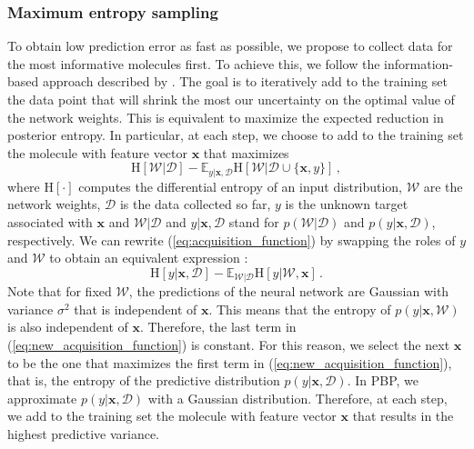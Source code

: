\subsubsection{Maximum entropy sampling}

To obtain low prediction error as fast as possible, we propose to collect data for the most informative molecules first. To achieve this, we follow the information-based approach described by \cite{MacKay_1992}. The goal is to iteratively add to the training set the data point that will shrink the most our uncertainty on the optimal value of the network weights. This is equivalent to maximize the expected reduction in posterior entropy. In particular, at each step, we choose to add to the training set the molecule with feature vector $\mathbf{x}$ that maximizes
\begin{equation}
\text{H}[\mathcal{W}|\mathcal{D}]  - 
\mathbb{E}_{y|\mathbf{x},\mathcal{D}}\text{H}[\mathcal{W}|\mathcal{D}\cup\{\mathbf{x},y\}]\,,\label{eq:acquisition_function}
\end{equation}
where $\text{H}[\cdot]$ computes the differential entropy of an input distribution, $\mathcal{W}$ are the network weights, $\mathcal{D}$ is the data collected so far, $y$ is the unknown target associated with $\mathbf{x}$ and $\mathcal{W}|\mathcal{D}$ and $y|\mathbf{x},\mathcal{D}$ stand for $p(\mathcal{W}|\mathcal{D})$ and $p(y|\mathbf{x},\mathcal{D})$, respectively. We can rewrite (\ref{eq:acquisition_function}) by swapping the roles of $y$ and $\mathcal{W}$ to obtain an equivalent expression \cite{houlsby2012collaborative}:
\begin{equation}
\text{H}[y | \mathbf{x},\mathcal{D}] - 
\mathbb{E}_{\mathcal{W} | \mathcal{D}}\text{H}[y | \mathcal{W},\mathbf{x}]\,.\label{eq:new_acquisition_function}
\end{equation}
Note that for fixed $\mathcal{W}$, the predictions of the neural network are Gaussian with variance $\sigma^2$ that is independent of $\mathbf{x}$. This means that the entropy of $p(y| \mathbf{x},\mathcal{W})$ is also independent of $\mathbf{x}$.
Therefore, the last term in (\ref{eq:new_acquisition_function}) is constant.
For this reason, we select the next $\mathbf{x}$ to be the one that maximizes the first term in (\ref{eq:new_acquisition_function}), that is,
the entropy of the predictive distribution $p(y| \mathbf{x},\mathcal{D})$. In PBP, we approximate $p(y| \mathbf{x},\mathcal{D})$ with a Gaussian distribution. Therefore, 
at each step, we add to the training set the molecule with feature vector $\mathbf{x}$ that results in the highest predictive variance.

